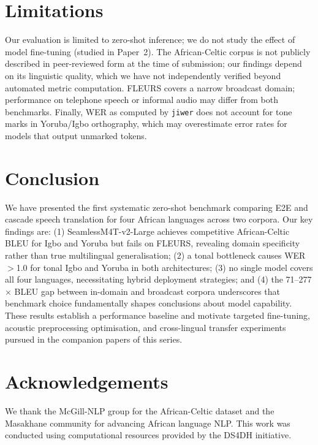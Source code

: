 \documentclass[11pt,a4paper]{article}
\newcommand{\modelSM}{SeamlessM4T-v2-Large}
\newcommand{\dataAC}{African-Celtic}
\begin{document}
\section{Limitations}
\label{sec:limitations}

Our evaluation is limited to zero-shot inference; we do not study the effect of model fine-tuning (studied in Paper~2). The \dataAC{} corpus is not publicly described in peer-reviewed form at the time of submission; our findings depend on its linguistic quality, which we have not independently verified beyond automated metric computation. FLEURS covers a narrow broadcast domain; performance on telephone speech or informal audio may differ from both benchmarks. Finally, WER as computed by \texttt{jiwer} does not account for tone marks in Yoruba/Igbo orthography, which may overestimate error rates for models that output unmarked tokens.

\section{Conclusion}
\label{sec:conclusion}

We have presented the first systematic zero-shot benchmark comparing E2E and cascade speech translation for four African languages across two corpora. Our key findings are: (1) \modelSM{} achieves competitive \dataAC{} BLEU for Igbo and Yoruba but fails on FLEURS, revealing domain specificity rather than true multilingual generalisation; (2) a tonal bottleneck causes WER $>$1.0 for tonal Igbo and Yoruba in both architectures; (3) no single model covers all four languages, necessitating hybrid deployment strategies; and (4) the 71–277$\times$ BLEU gap between in-domain and broadcast corpora underscores that benchmark choice fundamentally shapes conclusions about model capability. These results establish a performance baseline and motivate targeted fine-tuning, acoustic preprocessing optimisation, and cross-lingual transfer experiments pursued in the companion papers of this series.

\section*{Acknowledgements}
We thank the McGill-NLP group for the \dataAC{} dataset and the Masakhane community for advancing African language NLP. This work was conducted using computational resources provided by the DS4DH initiative.



\end{document}
